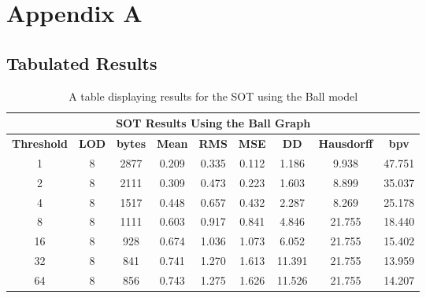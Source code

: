 \makeatletter
\chapter{Appendix A}
\label{AppendixA}

\section{Tabulated Results}

\begin{table}[h]
\begin{tabular}[c]{|c|c|c|c|c|c|c|c|c|}
\hline\multicolumn{9}{|c|}{\textbf{SOT Results Using the Ball Graph}}\\
\hline
\textbf{Threshold} & \textbf{LOD} & \textbf{bytes} & \textbf{Mean} & \textbf{RMS} & \textbf{MSE} & \textbf{DD} & \textbf{Hausdorff} & \textbf{bpv}\\
\hline
1 & 8 & 2877 & 0.209 & 0.335 & 0.112 & 1.186 & 9.938 & 47.751\\
\hline
2 & 8 & 2111 & 0.309 & 0.473 & 0.223 & 1.603 & 8.899 & 35.037\\
\hline
4 & 8 & 1517 & 0.448 & 0.657 & 0.432 & 2.287 & 8.269 & 25.178\\
\hline
8 & 8 & 1111 & 0.603 & 0.917 & 0.841 & 4.846 & 21.755 & 18.440\\
\hline
16 & 8 & 928 & 0.674 & 1.036 & 1.073 & 6.052 & 21.755 & 15.402\\
\hline
32 & 8 & 841 & 0.741 & 1.270 & 1.613 & 11.391 & 21.755 & 13.959\\
\hline
64 & 8 & 856 & 0.743 & 1.275 & 1.626 & 11.526 & 21.755 & 14.207\\
\hline
\end{tabular}
\caption{A table displaying results for the SOT using the Ball model}
\label{table:SOTTableBall}
\end{table}

